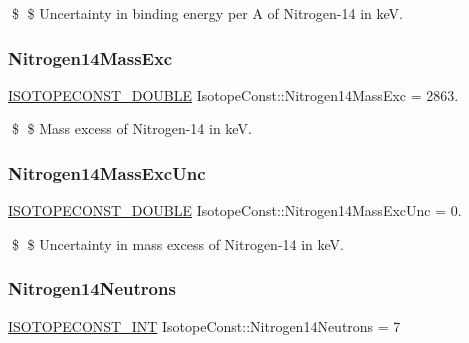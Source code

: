 \$ \$ Uncertainty in binding energy per A of Nitrogen-\/14 in keV. \mbox{\label{group___isotope_const-_nitrogen-_n14_ga4fe9f5a71562674f13177365b8e8871a}} 
\subsubsection{\texorpdfstring{Nitrogen14\+Mass\+Exc}{Nitrogen14MassExc}}
{\footnotesize\ttfamily \mbox{\hyperlink{group___isotope_const-_macros_ga8f45a7272ce02c0b4c65c44636ed719a}{I\+S\+O\+T\+O\+P\+E\+C\+O\+N\+S\+T\+\_\+\+D\+O\+U\+B\+LE}} Isotope\+Const\+::\+Nitrogen14\+Mass\+Exc = 2863.}

\$ \$ Mass excess of Nitrogen-\/14 in keV. \mbox{\label{group___isotope_const-_nitrogen-_n14_ga4ed31920859797539e14a5cc51fa0cfb}} 
\subsubsection{\texorpdfstring{Nitrogen14\+Mass\+Exc\+Unc}{Nitrogen14MassExcUnc}}
{\footnotesize\ttfamily \mbox{\hyperlink{group___isotope_const-_macros_ga8f45a7272ce02c0b4c65c44636ed719a}{I\+S\+O\+T\+O\+P\+E\+C\+O\+N\+S\+T\+\_\+\+D\+O\+U\+B\+LE}} Isotope\+Const\+::\+Nitrogen14\+Mass\+Exc\+Unc = 0.}

\$ \$ Uncertainty in mass excess of Nitrogen-\/14 in keV. \mbox{\label{group___isotope_const-_nitrogen-_n14_ga5a3aaa84cc8f989646564d92a00eaa8f}} 
\subsubsection{\texorpdfstring{Nitrogen14\+Neutrons}{Nitrogen14Neutrons}}
{\footnotesize\ttfamily \mbox{\hyperlink{group___isotope_const-_macros_ga5f18360b3e99483a35c32d789e62621c}{I\+S\+O\+T\+O\+P\+E\+C\+O\+N\+S\+T\+\_\+\+I\+NT}} Isotope\+Const\+::\+Nitrogen14\+Neutrons = 7}

